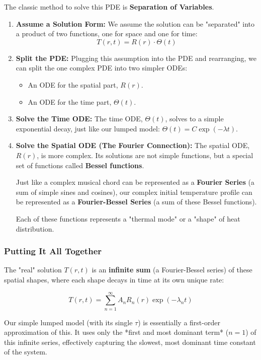 \documentclass[11pt, a4paper]{article}
\begin{document}
The classic method to solve this PDE is \textbf{Separation of Variables}.

\begin{enumerate}
    \item \textbf{Assume a Solution Form:} We assume the solution can be "separated" into a product of two functions, one for space and one for time:
    $$ T(r, t) = R(r) \cdot \Theta(t) $$
    
    \item \textbf{Split the PDE:} Plugging this assumption into the PDE and rearranging, we can split the one complex PDE into two simpler ODEs:
    \begin{itemize}
        \item An ODE for the spatial part, $R(r)$.
        \item An ODE for the time part, $\Theta(t)$.
    \end{itemize}
    
    \item \textbf{Solve the Time ODE:} The time ODE, $\Theta(t)$, solves to a simple exponential decay, just like our lumped model: $\Theta(t) = C \exp(-\lambda t)$.
    
    \item \textbf{Solve the Spatial ODE (The Fourier Connection):} The spatial ODE, $R(r)$, is more complex. Its solutions are not simple functions, but a special set of functions called \textbf{Bessel functions}.
    
    Just like a complex musical chord can be represented as a \textbf{Fourier Series} (a sum of simple sines and cosines), our complex initial temperature profile can be represented as a \textbf{Fourier-Bessel Series} (a sum of these Bessel functions).
    
    Each of these functions represents a "thermal mode" or a "shape" of heat distribution.
\end{enumerate}

\subsubsection{Putting It All Together}
The "real" solution $T(r, t)$ is an \textbf{infinite sum} (a Fourier-Bessel series) of these spatial shapes, where each shape decays in time at its own unique rate:

$$ T(r, t) = \sum_{n=1}^{\infty} A_n R_n(r) \exp(-\lambda_n t) $$

Our simple lumped model (with its single $\tau$) is essentially a first-order approximation of this. It uses only the *first and most dominant term* ($n=1$) of this infinite series, effectively capturing the slowest, most dominant time constant of the system.
\end{document}
